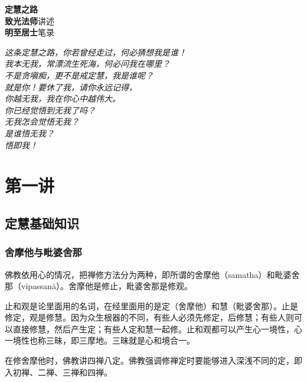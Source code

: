 \documentclass{book}
\begin{document}

\thispagestyle{empty}
\begin{center}
    \vfill
    {\huge\bfseries 定慧之路} \\
    \vfill
    {\bfseries 致光法师}\quad 讲述 \\
    {\bfseries 明至居士}\quad 笔录
\end{center}
\pagebreak

\thispagestyle{empty}
\begin{center}\itshape
    这条定慧之路，你若曾经走过，何必猜想我是谁！\\
    我本无我，常漂流生死海，何必问我在哪里？\\
    不是贪嗔痴，更不是戒定慧，我是谁呢？\\
    就是你！要休了我，请你永远记得，\\
    你越无我，我在你心中越伟大。\\
    你已经觉悟到无我了吗？\\
    无我怎会觉悟无我？\\
    是谁悟无我？\\
    悟即我！
\end{center}

\tableofcontents

\clearpage
{}

\chapter{第一讲}

\section{定慧基础知识}

\subsection{舍摩他与毗婆舍那}

佛教依用心的情况，把禅修方法分为两种，即所谓的舍摩他（samatha）和毗婆舍那（vipassanā）。舍摩他是修止，毗婆舍那是修观。

止和观是论里面用的名词，在经里面用的是定（舍摩他）和慧（毗婆舍那）。止是修定，观是修慧。因为众生根器的不同，有些人必须先修定，后修慧；有些人则可以直接修慧，然后产生定；有些人定和慧一起修。止和观都可以产生心一境性，心一境性也称三昧，即三摩地。三昧就是心和境合一。

在修舍摩他时，佛教讲四禅八定。佛教强调修禅定时要能够进入深浅不同的定，即入初禅、二禅、三禅和四禅。
\end{document}
